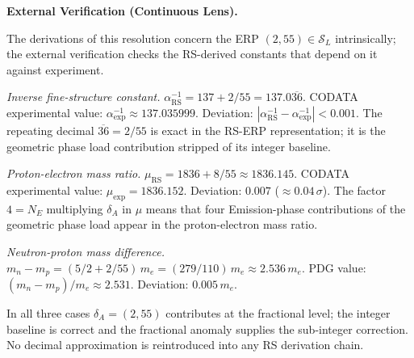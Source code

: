 \documentclass[11pt, letterpaper]{article}
\theoremstyle{definition}
\theoremstyle{plain}
\begin{document}
\begin{verifybox}
\textbf{External Verification (Continuous Lens).}

The derivations of this resolution concern the ERP $(2, 55) \in \mathcal{S}_L$
intrinsically; the external verification checks the RS-derived constants that depend
on it against experiment.

\textit{Inverse fine-structure constant.}
$\alpha^{-1}_\mathrm{RS} = 137 + 2/55 = 137.0\overline{36}$.
CODATA experimental value: $\alpha^{-1}_\mathrm{exp} \approx 137.035999$.
Deviation: $|\alpha^{-1}_\mathrm{RS} - \alpha^{-1}_\mathrm{exp}| < 0.001$.
The repeating decimal $\overline{36} = 2/55$ is exact in the RS-ERP representation;
it is the geometric phase load contribution stripped of its integer baseline.

\textit{Proton-electron mass ratio.}
$\mu_\mathrm{RS} = 1836 + 8/55 \approx 1836.145$.
CODATA experimental value: $\mu_\mathrm{exp} = 1836.152$.
Deviation: $0.007$ ($\approx 0.04\,\sigma$).
The factor $4 = N_E$ multiplying $\delta_A$ in $\mu$ means that four Emission-phase
contributions of the geometric phase load appear in the proton-electron mass ratio.

\textit{Neutron-proton mass difference.}
$m_n - m_p = (5/2 + 2/55)\,m_e = (279/110)\,m_e \approx 2.536\,m_e$.
PDG value: $(m_n - m_p)/m_e \approx 2.531$.
Deviation: $0.005\,m_e$.

In all three cases $\delta_A = (2, 55)$ contributes at the fractional level; the
integer baseline is correct and the fractional anomaly supplies the sub-integer
correction. No decimal approximation is reintroduced into any RS derivation chain.
\end{verifybox}
\end{document}
